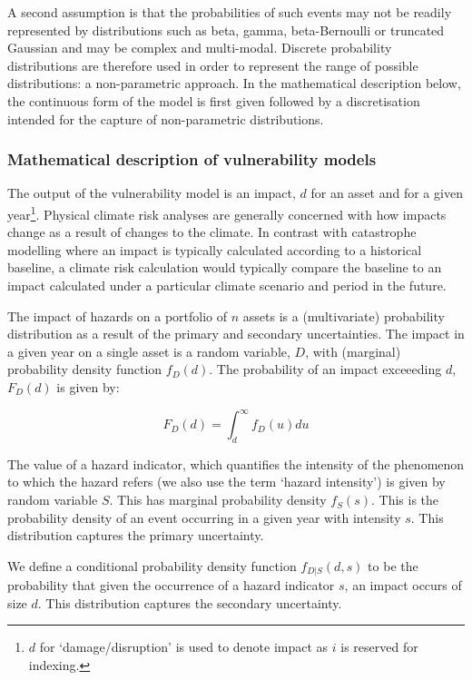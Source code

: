 \documentclass[a4paper,11pt]{extarticle} %
\begin{document}
A second assumption is that the probabilities of such events may not be readily represented by distributions such as beta, gamma, beta-Bernoulli or truncated Gaussian and may be complex and multi-modal. Discrete probability distributions are therefore used in order to represent the range of possible distributions: a non-parametric approach. In the mathematical description below, the continuous form of the model is first given followed by a discretisation intended for the capture of non-parametric distributions.

\subsubsection{Mathematical description of vulnerability models}
The output of the vulnerability model is an impact, $d$ for an asset and for a given year\footnote{$d$ for `damage/disruption' is used to denote impact as $i$ is reserved for indexing.}. Physical climate risk analyses are generally concerned with how impacts change as a result of changes to the climate. In contrast with catastrophe modelling where an impact is typically calculated according to a historical baseline, a climate risk calculation would typically compare the baseline to an impact calculated under a particular climate scenario and period in the future.

The impact of hazards on a portfolio of $n$ assets is a (multivariate) probability distribution as a result of the primary and secondary uncertainties. The impact in a given year on a single asset is a random variable, $D$, with (marginal) probability density function $f_D(d)$. The probability of an impact exceeeding $d$, $F_D(d)$ is given by:

 \begin{equation}
 	\label{Eq:ImpactExceed}
 	F_D(d) = \int_d^{\infty} f_D(u) du
 \end{equation}


The value of a hazard indicator, which quantifies the intensity of the phenomenon to which the hazard refers (we also use the term `hazard intensity') is given by random variable $S$. This has marginal  probability density $f_S(s)$. This is the probability density of an event occurring in a given year with intensity $s$. This distribution captures the primary uncertainty.

We define a conditional probability density function $f_{D|S}(d, s)$ to be the probability that given the occurrence of a hazard indicator $s$, an impact occurs of size $d$. This distribution captures the secondary uncertainty.
\end{document}

